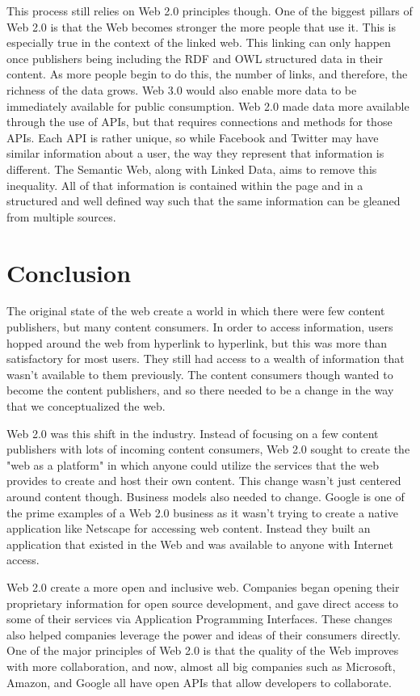 \documentclass[12pt]{article}
\begin{document}
This process still relies on Web 2.0 principles though.  One of the biggest pillars of Web 2.0 is that the Web becomes stronger the more people that use it. This is especially true in the context of the linked web.  This linking can only happen once  publishers being including the RDF and OWL structured data in their content.  As more people begin to do this, the number of links, and therefore, the richness of the data grows.  Web 3.0 would also enable more data to be immediately available for public consumption.  Web 2.0 made data more available through the use of APIs, but that requires connections and methods for those APIs.  Each API is rather unique, so while Facebook and Twitter may have similar information about a user, the way they represent that information is different.  The Semantic Web, along with Linked Data, aims to remove this inequality.  All of that information is contained within the page and in a structured and well defined way such that the same information can be gleaned from multiple sources.

\section{Conclusion}
The original state of the web create a world in which there were few content publishers, but many content consumers.  In order to access information, users hopped around the web from hyperlink to hyperlink, but this was more than satisfactory for most users.  They still had access to a wealth of information that wasn't available to them previously.  The content consumers though wanted to become the content publishers, and so there needed to be a change in the way that we conceptualized the web.

Web 2.0 was this shift in the industry.  Instead of focusing on a few content publishers with lots of incoming content consumers, Web 2.0 sought to create the "web as a platform" in which anyone could utilize the services that the web provides to create and host their own content.  This change wasn't just centered around content though.  Business models also needed to change.  Google is one of the prime examples of a Web 2.0 business as it wasn't trying to create a native application like Netscape for accessing web content.  Instead they built an application that existed in the Web and was available to anyone with Internet access.

Web 2.0 create a more open and inclusive web.  Companies began opening their proprietary information for open source development, and gave direct access to some of their services via Application Programming Interfaces.  These changes also helped companies leverage the power and ideas of their consumers directly.  One of the major principles of Web 2.0 is that the quality of the Web improves with more collaboration, and now, almost all big companies such as Microsoft, Amazon, and Google all have open APIs that allow developers to collaborate.
\end{document}
